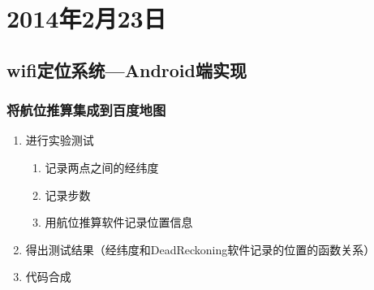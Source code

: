 \chapter{2014年2月23日}
\section{wifi定位系统—Android端实现}
\subsection{将航位推算集成到百度地图}
\begin{enumerate}
    \item
    进行实验测试
    \begin{enumerate}
    \item
    记录两点之间的经纬度
    \item
    记录步数
    \item
    用航位推算软件记录位置信息
    \end{enumerate}
    \item
    得出测试结果（经纬度和DeadReckoning软件记录的位置的函数关系）
    \item
    代码合成
\iffalse
    \item
    进行定位算法的几要点：
    \begin{enumerate}
    \item
    第一：收集多组SS样本，并且从一个基站使用一个样本均值。
    \item
    第二：为了确定位置和方向，确定用哪一组数据
    \begin{enumerate}
    \item
    一：加入离线状态下的数据进行考虑
    \item
    二：信号传播建模（develop a model that accounts for both free-space loss and loss）
    \end{enumerate}
    \item
     第三：need a metric and a search methodology to compare multiple locations and pick the one that best matches the observed signal strength
    \end{enumerate}
    \item
    对于以下三种方法：The empirical method performs significantly better than both of the other methods
    \begin{enumerate}
    \item
    First:empirical method
    \item
    Second:strongest base station
    \item
    Third:random method
    \end{enumerate}
    \item
    Unlike the basic analysis where we only considered the single nearest neighbor in signal space,we now consider k nearest neighbors, for various values of k.averaging the coordinates of the neighbors may yield an estimate that is closer to the user’s true location
\fi
\end{enumerate}
